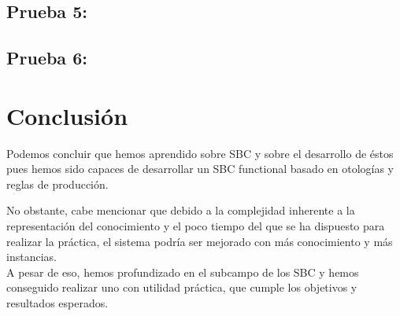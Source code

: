 \documentclass[12]{article}
\begin{document}
\subsection{Prueba 5: }
\subsection{Prueba 6: }
\section{Conclusión}
Podemos concluir que hemos aprendido sobre SBC y sobre el desarrollo de éstos pues hemos sido capaces de desarrollar un SBC functional basado en otologías y reglas de producción.

No obstante, cabe mencionar que debido a la complejidad inherente a la representación del conocimiento y el poco tiempo del que se ha dispuesto para realizar la práctica, el sistema podría ser mejorado con más conocimiento y más instancias. 
\\

A pesar de eso, hemos profundizado en el subcampo de los SBC y hemos conseguido realizar uno con utilidad práctica, que cumple los objetivos y resultados esperados.
\end{document}
